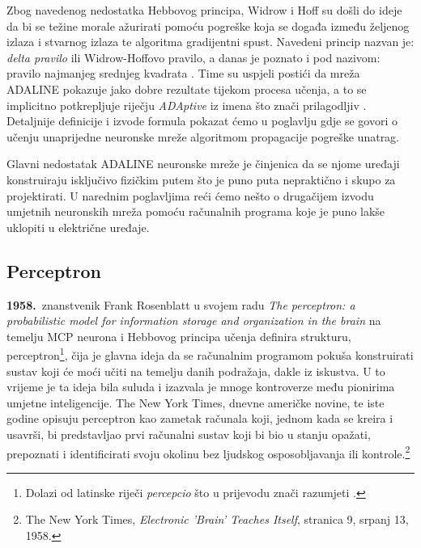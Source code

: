 \documentclass[times, utf8, zavrsni]{fer}
\begin{document}
Zbog navedenog nedostatka Hebbovog principa, Widrow i Hoff su došli do ideje da bi se težine morale ažurirati pomoću pogreške  koja se događa između željenog izlaza i stvarnog izlaza te algoritma gradijentni spust. Navedeni princip nazvan je: \textit{delta pravilo}  ili Widrow-Hoffovo pravilo, a danas je poznato i pod nazivom: pravilo najmanjeg srednjeg kvadrata . Time su uspjeli postići da mreža ADALINE pokazuje jako dobre rezultate tijekom procesa učenja, a to se implicitno potkrepljuje riječju \textit{ADAptive} iz imena što znači prilagodljiv \citep{picton2000}. Detaljnije definicije i izvode formula pokazat ćemo u poglavlju gdje se govori o učenju unaprijedne neuronske mreže algoritmom propagacije pogreške unatrag.

Glavni nedostatak ADALINE neuronske mreže je činjenica da se njome uređaji konstruiraju isključivo fizičkim putem što je puno puta nepraktično i skupo za projektirati. U narednim poglavljima reći ćemo nešto o drugačijem izvodu umjetnih neuronskih mreža pomoću računalnih programa koje je puno lakše uklopiti u električne uređaje.

\subsection{Perceptron}
\textbf{1958.}\ znanstvenik Frank Rosenblatt u svojem radu \textit{The perceptron: a probabilistic model for information storage and organization in the brain} na temelju MCP neurona i Hebbovog principa učenja definira strukturu, perceptron\footnote{Dolazi od latinske riječi \textit{percepcio} što u prijevodu znači razumjeti .}, čija je glavna ideja da se računalnim programom pokuša konstruirati sustav koji će moći učiti na temelju danih podražaja, dakle iz iskustva. U to vrijeme je ta ideja bila suluda i izazvala je mnoge kontroverze među pionirima umjetne inteligencije. The New York Times, dnevne američke novine, te iste godine opisuju perceptron kao zametak  računala koji, jednom kada se kreira i usavrši, bi predstavljao prvi računalni sustav koji bi bio u stanju opažati, prepoznati i identificirati svoju okolinu bez ljudskog osposobljavanja ili kontrole.\footnote{The New York Times, \textit{Electronic 'Brain' Teaches Itself}, stranica 9, srpanj 13, 1958.}
\end{document}

